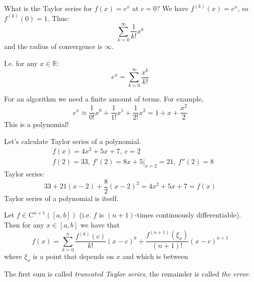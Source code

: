 \begin{example}[1]
    What is the Taylor series for $f(x) = e^x$ at $c = 0$?
    We have $f^{(k)}(x) = e^x$, so $f^{(k)}(0) = 1$.
    Thus: \[
        \sum_{k = 0}^{\infty} \frac{1}{k!} x^k
    \]
    and the radius of convergence is $\infty$.

    I.e. for any $x \in \mathbb{R}$:
    \[e^x = \sum_{k = 0}^{\infty} \frac{x^k}{k!}\]

    For an algorithm we need a finite amount of terms. For example,
    \[
        e^x \approx \frac{1}{0!} x^0 + \frac{1}{1!} x^1 + \frac{1}{2!} x^2 =
        1 + x + \frac{x^2}{2}
    \]
    This is a polynomial!
\end{example}

\begin{example}[2]
    Let's calculate Taylor series of a polynomial.
    \begin{align*}
        &
        f(x) = 4x^2 + 5x + 7,\ c = 2
        \\&
        f(2) = 33,\ f'(2) = 8x + 5\Big|_{x = 2} = 21,\ f''(2) = 8
    \end{align*}
    Taylor series:
    \[
        33 + 21(x - 2) + \frac{8}{2} (x - 2)^2 = 4x^2 + 5x + 7 = f(x)
    \]
    Taylor series of a polynomial is itself.
\end{example}

\begin{theorem}
    Let $f \in \mathrm{C}^{n + 1}([a, b])$ (i.e. $f$ is $(n+1)$-times
    continuously differentiable).
    Then for any $x \in [a, b]$ we have that 
    \[
        f(x) = \sum_{k=0}^n \frac{f^{(k)}(c)}{k!}(x - c)^k +
        \frac{f^{(n+1)}(\xi_x)}{(n+1)!} (x - c)^{n+1}
    \]
    where $\xi_x$ is a point that depends on $x$ and which is between

    The first sum is called \textit{truncated Taylor series}, the remainder is called \textit{the error}.
\end{theorem}